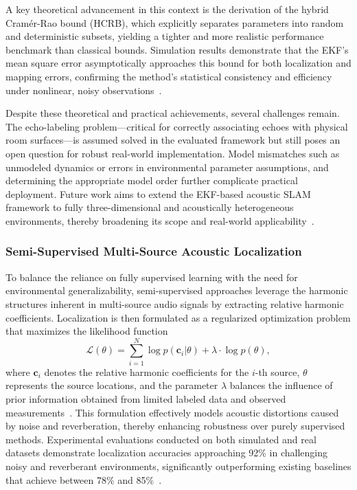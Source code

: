 \documentclass[sigconf]{acmart}
\begin{document}
A key theoretical advancement in this context is the derivation of the hybrid Cramér-Rao bound (HCRB), which explicitly separates parameters into random and deterministic subsets, yielding a tighter and more realistic performance benchmark than classical bounds. Simulation results demonstrate that the EKF's mean square error asymptotically approaches this bound for both localization and mapping errors, confirming the method’s statistical consistency and efficiency under nonlinear, noisy observations~\cite{ref39}.

Despite these theoretical and practical achievements, several challenges remain. The echo-labeling problem—critical for correctly associating echoes with physical room surfaces—is assumed solved in the evaluated framework but still poses an open question for robust real-world implementation. Model mismatches such as unmodeled dynamics or errors in environmental parameter assumptions, and determining the appropriate model order further complicate practical deployment. Future work aims to extend the EKF-based acoustic SLAM framework to fully three-dimensional and acoustically heterogeneous environments, thereby broadening its scope and real-world applicability~\cite{ref39}.

\subsubsection{Semi-Supervised Multi-Source Acoustic Localization}

To balance the reliance on fully supervised learning with the need for environmental generalizability, semi-supervised approaches leverage the harmonic structures inherent in multi-source audio signals by extracting relative harmonic coefficients. Localization is then formulated as a regularized optimization problem that maximizes the likelihood function
\[
\mathcal{L}(\theta) = \sum_{i=1}^N \log p(\mathbf{c}_i | \theta) + \lambda \cdot \log p(\theta),
\]
where $\mathbf{c}_i$ denotes the relative harmonic coefficients for the $i$-th source, $\theta$ represents the source locations, and the parameter $\lambda$ balances the influence of prior information obtained from limited labeled data and observed measurements~\cite{ref52}. This formulation effectively models acoustic distortions caused by noise and reverberation, thereby enhancing robustness over purely supervised methods. Experimental evaluations conducted on both simulated and real datasets demonstrate localization accuracies approaching 92\% in challenging noisy and reverberant environments, significantly outperforming existing baselines that achieve between 78\% and 85\%~\cite{ref52}.
\end{document}
